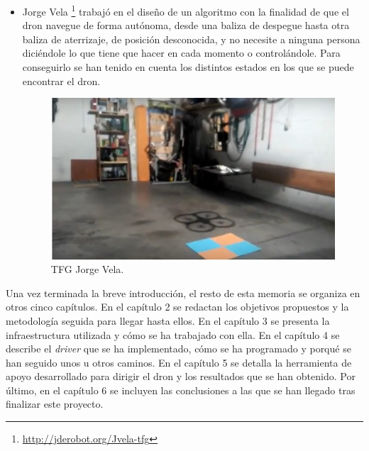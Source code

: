 \begin{itemize}
\item Jorge Vela\cite{jorgeVela} \footnote{\url{http://jderobot.org/Jvela-tfg}} trabajó en el diseño de un algoritmo con la finalidad de que el dron navegue de forma autónoma, desde una baliza de despegue hasta otra baliza de aterrizaje, de posición desconocida, y no necesite a ninguna persona diciéndole lo que tiene que hacer en cada momento o controlándole. Para conseguirlo se han tenido en cuenta los distintos estados en los que se puede encontrar el dron.

\begin{figure}[H]
  \centering
  \includegraphics[scale=0.7]{imagenes/Jorge-Vela.jpg}
  \caption{TFG Jorge Vela.}
  \label{fig:jorgeVela}
\end{figure}

\end{itemize}

Una vez terminada la breve introducción, el resto de esta memoria se organiza en otros cinco capítulos. En el capítulo 2 se redactan los objetivos propuestos y la metodología seguida para llegar hasta ellos. En el capítulo 3 se presenta la infraestructura utilizada y cómo se ha trabajado con ella. En el capítulo 4 se describe el \textit{driver} que se ha implementado, cómo se ha programado y porqué se han seguido unos u otros caminos. En el capítulo 5 se detalla la herramienta de apoyo desarrollado para dirigir el dron y los resultados que se han obtenido. Por último, en el capítulo 6 se incluyen las conclusiones a las que se han llegado tras finalizar este proyecto.
